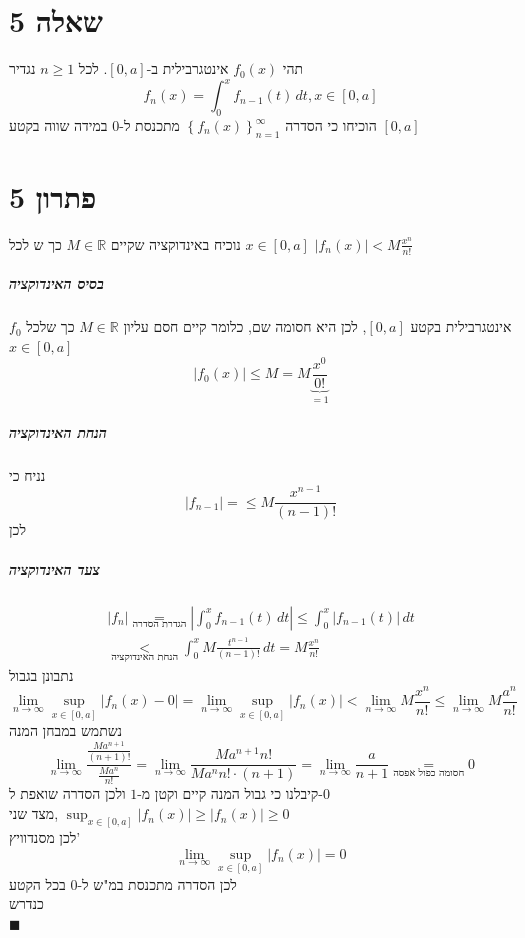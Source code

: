 \documentclass[12pt, titlepage]{article}
\begin{document}
\part*{שאלה 5}
תהי $f_0\left(x\right)$ אינטגרבילית ב-$\left[0,a\right]$. לכל $n\geq 1$ נגדיר 
\[
    f_n\left(x\right)=\int^x_0 f_{n-1}(t)\,dt, x\in\left[0,a\right]
\]
הוכיחו כי הסדרה $\left\{f_n(x)\right\}_{n=1}^\infty$ מתכנסת ל-$0$ במידה שווה בקטע $\left[0,a\right]$
\part*{פתרון 5}
נוכיח באינדוקציה שקיים $M\in \mathbb{R}$ כך ש לכל $x\in\left[0,a\right]$ $\left|f_n(x)\right| < M \frac{x^n}{n!}$
\subsubsection*{בסיס האינדוקציה}
$f_0$ אינטגרבילית בקטע $\left[0,a\right]$, לכן היא חסומה שם, כלומר קיים חסם עליון $M\in\mathbb{R}$ כך שלכל $x\in\left[0,a\right]$
\[
    \left|f_0\left(x\right)\right| \leq M = M \underbrace{\frac{x^0}{0!}}_{=1}
\]
\subsubsection*{הנחת האינדוקציה}
נניח כי 
\[
    \left|f_{n-1}\right| = \leq M\frac{x^{n-1}}{\left(n-1\right)!}
\]
לכן

\subsubsection*{צעד האינדוקציה}
\begin{gather*}
    \left|f_{n}\right| \underset{\text{הגדרת הסדרה}}{=} \left|\int_0^x f_{n-1}\left(t\right)\, dt\right| \leq \int_0^x \left|f_{n-1}\left(t\right)\right|\,dt\\
    \underset{\text{הנחת האינדוקציה}}{<}\int_0^x M\frac{t^{n-1}}{\left(n-1\right)!} \,dt  = M\frac{x^n}{n!}
\end{gather*}
נתבונן בגבול
\[
    \lim_{n\to\infty} \sup_{x\in\left[0,a\right]} \left|f_n\left(x\right)-0\right| =\lim_{n\to\infty} \sup_{x\in\left[0,a\right]} \left|f_n(x)\right| < \lim_{n\to\infty} M \frac{x^n}{n!} \leq \lim_{n\to\infty} M \frac{a^n}{n!}
\]
נשתמש במבחן המנה
\[
    \lim_{n\to\infty}    \frac{\frac{M a^{n+1}}{\left(n+1\right)!}}{\frac{M a^n}{n!}} = \lim_{n\to\infty} \frac{M a^{n+1} n!}{M a^n n! \cdot \left(n+1\right)} =\lim_{n\to\infty} \frac{a}{n+1} \underset{\text{חסומה כפול אפסה}}{=} 0
\]
קיבלנו כי גבול המנה קיים וקטן מ-$1$ ולכן הסדרה שואפת ל-$0$\\
מצד שני, $\sup_{x\in\left[0,a\right]} \left|f_n(x)\right| \geq \left|f_n(x)\right| \geq 0$\\
לכן מסנדוויץ'
\[
    \lim_{n\to\infty} \sup_{x\in\left[0,a\right]} \left|f_n(x)\right| = 0
\]
לכן הסדרה מתכנסת במ"ש ל-$0$ בכל הקטע\\
כנדרש\\
$\blacksquare$
\newpage
\end{document}
